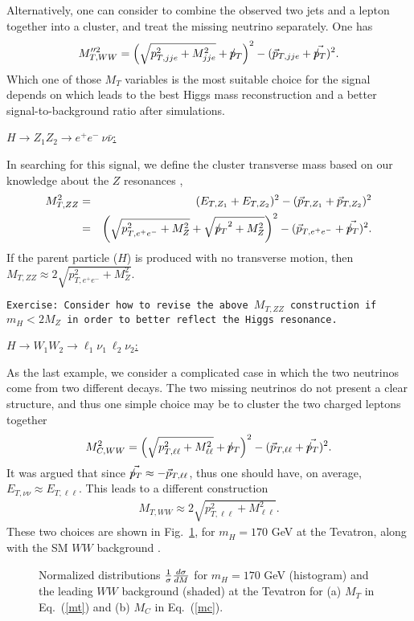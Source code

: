 \documentclass[prd,aps,floats,preprintnumbers,preprint,superscriptaddress,floatfix,nofootinbib]{revtex4}
\newcommand{ \slashchar }[1]{\setbox0=\hbox{$#1$}   %
   \dimen0=\wd0                                     %
   \setbox1=\hbox{/} \dimen1=\wd1                   %
   \ifdim\dimen0>\dimen1                            %
      \rlap{\hbox to \dimen0{\hfil/\hfil}}          %
      #1                                            %
   \else                                            %
      \rlap{\hbox to \dimen1{\hfil$#1$\hfil}}       %
      /                                             %
   \fi}                                             %
\def\ptmiss{\slashchar{p}_{T}}
\def\epem{e^+e^-}
\def\bea{\begin{eqnarray}}
\def\eea{\end{eqnarray}}
\begin{document}
Alternatively, one can consider to combine the observed two jets and a lepton 
together into a cluster, and treat the missing neutrino separately. One has 
\bea
 M_{T,WW}^{\prime\prime 2}
= \left(\sqrt{p_{T,jje}^2 + M_{jje}^2} + \ptmiss   \right)^2 
- (\vec p_{T,jje} + \vec{\ptmiss } )^2.
\nonumber
\eea
Which one of those $M_T$ variables is the most suitable choice for the signal
depends on which leads to the best Higgs mass reconstruction and a better
signal-to-background ratio after simulations.

\vskip 0.2cm
\noindent
\underline{$H\to Z_1 Z_2 \to \epem\ \nu\bar\nu$:}

In searching for this signal,  we define the cluster transverse mass based
on our knowledge about the $Z$ resonances  \cite{MTH},
\bea
\nonumber
 M_{T,ZZ}^2 &=&  (E_{T,Z_1} + E_{T,Z_2} )^2 - (\vec p_{T,Z_1} + \vec p_{T,Z_2} )^2 \\
&=& \left(\sqrt{p_{T,\epem}^2 + M_Z^2} + \sqrt{ {\ptmiss}^2 + M_Z^2}  \right)^2 
- (\vec p_{T,\epem} + \vec{\ptmiss } )^2.
\nonumber
\eea
If the parent particle ($H$) is produced with no transverse motion, then
$M_{T,ZZ} \approx 2 \sqrt{p_{T,\epem}^2 + M_Z^2}. $

{
\vskip 0.2cm
\noindent
\tt Exercise: Consider how to revise the above $M_{T,ZZ}$ construction
if $m_H^{} < 2M_Z$ in order to better reflect the Higgs resonance.
\vskip 0.2cm
}

\vskip 0.2cm
\noindent
\underline{$H\to W_1 W_2 \to \ell_1\nu_1\ \ell_2 \nu_2$:}

As the last example, we consider a complicated case in which the two
neutrinos come from two different decays. The two missing neutrinos
do not present a clear structure, and thus one simple choice may be
to cluster the two charged leptons together  \cite{CMT}
\bea
 M_{C,WW}^{2}
= \left(\sqrt{p_{T,\ell\ell}^2 + M_{\ell\ell}^2} + \ptmiss   \right)^2 
- (\vec p_{T,\ell\ell} + \vec{\ptmiss } )^2.
\label{mc}
\eea
It was argued that since $\vec{\ptmiss} \approx - \vec p_{T,\ell\ell}$,
thus one should have, on average, $E_{T,\nu\nu} \approx E_{T, \ell\ell}$. 
This leads to a different construction \cite{Herbi}
\bea
 M_{T,WW}^{} \approx 2 \sqrt{p_{T,\ell\ell}^2 + M_{\ell\ell}^2}.
\label{mt}
\eea
These two choices are shown in Fig.~\ref{MTtc}, for $m_H^{}=170$ GeV
at the Tevatron, along with the SM $WW$ background \cite{HanZhang}.

\begin{center}
\begin{figure}[tb]
\vskip -1cm
\caption{ Normalized distributions 
${1\over \sigma} {d\sigma\over d M}$ for  $m_H^{}=170$ GeV (histogram)
and the leading $WW$ background (shaded) at the Tevatron for (a) $M_T$ 
in Eq.~(\ref{mt}) and (b) $M_C$ in Eq.~(\ref{mc}).}
\label{MTtc}
\end{figure}
\end{center}
 
\end{document}
